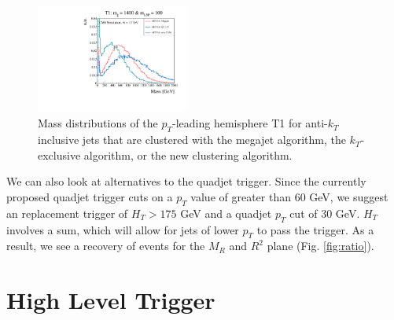 \documentclass[twocolumn,aps,prd,reprint]{revtex4-1}
\begin{document}
\begin{figure}
\includegraphics[width=0.45\textwidth]{T1_1400_100_new_masses.pdf}
\caption{\label{fig:t1_masses} Mass distributions of the $p_T$-leading hemisphere T1 for anti-$k_T$ inclusive jets that are clustered with the megajet algorithm, the $k_T$-exclusive algorithm, or the new clustering algorithm. }
\end{figure}
\par We can also look at alternatives to the quadjet trigger. Since the currently proposed quadjet trigger cuts on a $p_T$ value of greater than 60 GeV, we suggest an replacement trigger of $H_T > 175$ GeV and a quadjet $p_{T}$ cut of 30 GeV. $H_T$ involves a sum, which will allow for jets of lower $p_{T}$ to pass the trigger. As a result, we see a recovery of events for the $M_R$ and $R^2$ plane (Fig. \ref{fig:ratio}).
\section{High Level Trigger}
\end{document}
